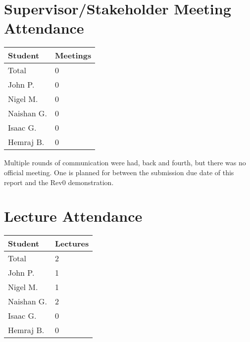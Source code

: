 \documentclass{article}
\begin{document}

\newpage
\section{Supervisor/Stakeholder Meeting Attendance}



\begin{table}[H]
\centering
\begin{tabular}{ll}
\toprule
\textbf{Student} & \textbf{Meetings}\\
\midrule
Total & 0\\
John P. & 0\\
Nigel M. & 0\\
Naishan G. & 0\\
Isaac G. & 0\\
Hemraj B. & 0\\
\bottomrule
\end{tabular}
\end{table}


Multiple rounds of communication were had, back and fourth, but there was no official meeting. One is planned for between the submission due date of this report and the Rev0 demonstration.

\newpage
\section{Lecture Attendance}


\begin{table}[H]
\centering
\begin{tabular}{ll}
\toprule
\textbf{Student} & \textbf{Lectures}\\
\midrule
Total & 2\\
John P. & 1\\
Nigel M. & 1\\
Naishan G. & 2\\
Isaac G. & 0\\
Hemraj B. & 0\\
\bottomrule
\end{tabular}
\end{table}
\end{document}

